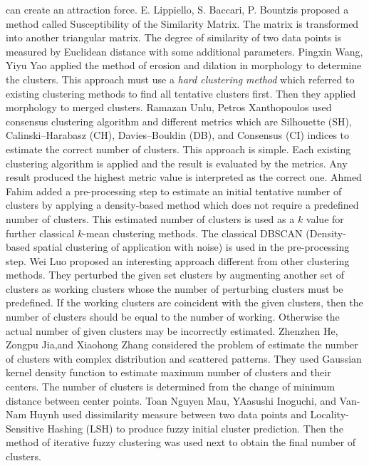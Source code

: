 \documentclass[lettersize,journal]{IEEEtran}
\begin{document}
can create an attraction force. E. Lippiello, S. Baccari, P. Bountzis \cite{Lippiello} proposed a method
called Susceptibility of the Similarity Matrix. The matrix is transformed into another triangular matrix. 
The degree of similarity of two data points is measured by Euclidean distance with some additional 
parameters. Pingxin Wang, Yiyu Yao  \cite{Wang} applied the method of erosion and dilation in morphology
to determine the clusters. This approach must use a {\em hard clustering method} which referred to
existing clustering methods to find all tentative clusters first. Then they applied morphology to merged 
clusters. Ramazan Unlu, Petros Xanthopoulos \cite{Ramazen} used consensus clustering algorithm and 
different metrics which are Silhouette (SH), Calinski–Harabasz (CH), Davies–Bouldin (DB), and
Consensus (CI) indices to estimate the correct number of clusters. This approach is simple. Each 
existing clustering algorithm is applied and the result is evaluated by the metrics. Any result produced
the highest metric value is interpreted as the correct one.
Ahmed Fahim \cite{Fahim} added a pre-processing step to estimate an initial tentative number of 
clusters by applying a density-based method which does not require a predefined number of clusters. 
This estimated number of clusters is used as a $k$ value for further classical $k$-mean clustering methods.
The classical DBSCAN (Density-based spatial clustering of application with noise) is used in
the pre-processing step. Wei Luo \cite{Luo} proposed an interesting approach different from other 
clustering methods. They perturbed the given set clusters by augmenting another set of clusters as 
working clusters whose the number of perturbing clusters must be predefined. If the working clusters are 
coincident with the given clusters, then the number of clusters should be equal to the number of working. 
Otherwise the actual number of given clusters may be incorrectly estimated.  
Zhenzhen He, Zongpu Jia,and  Xiaohong Zhang \cite{He} considered the problem of estimate the number of 
clusters with complex distribution and scattered patterns. They used Gaussian kernel density function to 
estimate maximum number of clusters and their centers. The number of clusters is determined from
the change of minimum distance between center points. 
Toan Nguyen Mau, YAasushi Inoguchi, and Van-Nam Huynh \cite{Toan} used dissimilarity measure between two
data points and Locality-Sensitive Hashing (LSH) to produce fuzzy initial cluster prediction. Then the 
method of iterative fuzzy clustering was used next to obtain the final number of clusters. 
\end{document}
